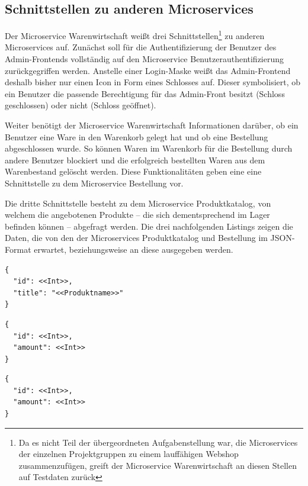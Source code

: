 \subsection{Schnittstellen zu anderen Microservices}
\label{subsec: Schnittstellen zu anderen Microservices}
Der Microservice Warenwirtschaft weißt drei Schnittstellen\footnote{Da es nicht Teil der übergeordneten Aufgabenstellung war, die Microservices der einzelnen Projektgruppen zu einem lauffähigen Webshop zusammenzufügen, greift der Microservice Warenwirtschaft an diesen Stellen auf Testdaten zurück} zu anderen Microservices auf. Zunächst soll für die Authentifizierung der Benutzer des Admin-Frontends vollständig auf den Microservice Benutzerauthentifizierung zurückgegriffen werden. Anstelle einer Login-Maske weißt das Admin-Frontend deshalb bisher nur einen Icon in Form eines Schlosses auf. Dieser symbolisiert, ob ein Benutzer die passende Berechtigung für das Admin-Front besitzt (Schloss geschlossen) oder nicht (Schloss geöffnet). \par
Weiter benötigt der Microservice Warenwirtschaft Informationen darüber, ob ein Benutzer eine Ware in den Warenkorb gelegt hat und ob eine Bestellung abgeschlossen wurde. So können Waren im Warenkorb für die Bestellung durch andere Benutzer blockiert und die erfolgreich bestellten Waren aus dem Warenbestand gelöscht werden. Diese Funktionalitäten geben eine eine Schnittstelle zu dem Microservice Bestellung vor. \par 
Die dritte Schnittstelle besteht zu dem Microservice Produktkatalog, von welchem die angebotenen Produkte -- die sich dementsprechend im Lager befinden können -- abgefragt werden. Die drei nachfolgenden Listings zeigen die Daten, die von den der Microservices Produktkatalog und Bestellung im JSON-Format erwartet, beziehungsweise an diese ausgegeben werden. 

\begin{lstlisting}[caption=Datenabfrage aus dem Produktkatalog]
{
  "id": <<Int>>,
  "title": "<<Produktname>>"
}
\end{lstlisting}


\begin{lstlisting}[caption=Datenabfrage von der Bestellung (Waren im Warenkorb abgelegt)]
{
  "id": <<Int>>,
  "amount": <<Int>>
}
\end{lstlisting}



\begin{lstlisting}[caption=Datenabfrage von der Bestellung (Waren wurden bestellt)]
{
  "id": <<Int>>,
  "amount": <<Int>>
}
\end{lstlisting}


